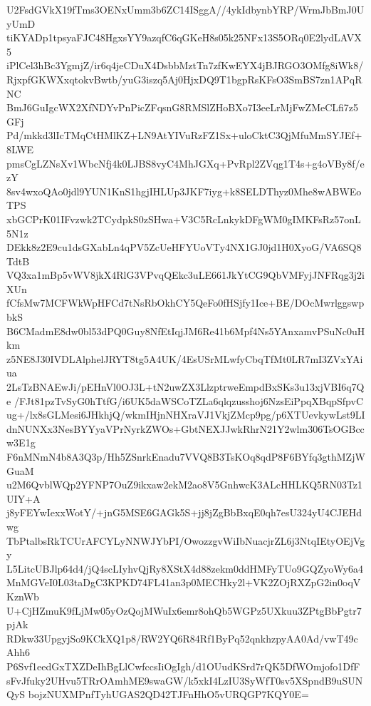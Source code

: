 U2FsdGVkX19fTms3OENxUmm3b6ZC14ISggA//4ykIdbynbYRP/WrmJbBmJ0UyUmD
tiKYADp1tpsyaFJC48HgxsYY9azqfC6qGKeH8s05k25NFx13S5ORq0E2lydLAVX5
iPlCel3hBc3YgmjZ/ir6q4jeCDuX4DsbbMztTn7zfKwEYX4jBJRGO3OMfg8iWk8/
RjxpfGKWXxqtokvBwtb/yuG3iszq5Aj0HjxDQ9T1bgpRsKFsO3SmBS7zn1APqRNC
BmJ6GuIgcWX2XfNDYvPnPicZFqsnG8RMSlZHoBXo7I3eeLrMjFwZMeCLfi7z5GFj
Pd/mkkd3lIcTMqCtHMlKZ+LN9AtYIVuRzFZ1Sx+uloCktC3QjMfuMmSYJEf+8LWE
pmsCgLZNsXv1WbcNfj4k0LJBS8vyC4MhJGXq+PvRpl2ZVqg1T4s+g4oVBy8f/ezY
8sv4wxoQAo0jdl9YUN1KnS1hgjIHLUp3JKF7iyg+k8SELDThyz0Mhe8wABWEoTPS
xbGCPrK01IFvzwk2TCydpkS0zSHwa+V3C5RcLnkykDFgWM0gIMKFsRz57onL5N1z
DEkk8z2E9cu1dsGXabLn4qPV5ZcUeHFYUoVTy4NX1GJ0jd1H0XyoG/VA6SQ8TdtB
VQ3xa1mBp5vWV8jkX4RlG3VPvqQEkc3uLE661JkYtCG9QbVMFyjJNFRqg3j2iXUn
fCfsMw7MCFWkWpHFCd7tNsRbOkhCY5QeFo0fHSjfy1Ice+BE/DOcMwrlggswpbkS
B6CMadmE8dw0bl53dPQ0Guy8NfEtIqjJM6Re41b6Mpf4Ns5YAnxamvPSuNc0uHkm
z5NE8J30IVDLAlphelJRYT8tg5A4UK/4EsUSrMLwfyCbqTfMt0LR7mI3ZVxYAiua
2LsTzBNAEwJi/pEHnVl0OJ3L+tN2uwZX3LlzptrweEmpdBxSKs3u13xjVBI6q7Qe
/FJt81pzTvSyG0hTtfG/i6UK5daWSCoTZLa6qlqzusshoj6NzsEiPpqXBqpSfpvC
ug+/lx8sGLMesi6JHkhjQ/wkmIHjnNHXraVJ1VkjZMcp9pg/p6XTUevkywLst9LI
dnNUNXx3NesBYYyaVPrNyrkZWOs+GbtNEXJJwkRhrN21Y2wlm306TsOGBccw3E1g
F6nMNmN4b8A3Q3p/Hh5ZSnrkEnadu7VVQ8B3TsKOq8qdP8F6BYfq3gthMZjWGuaM
u2M6QvblWQp2YFNP7OuZ9ikxaw2ekM2ao8V5GnhwcK3ALcHHLKQ5RN03Tz1UIY+A
j8yFEYwIexxWotY/+jnG5MSE6GAGk5S+jj8jZgBbBxqE0qh7esU324yU4CJEHdwg
TbPtalbsRkTCUrAFCYLyNNWJYbPI/OwozzgvWiIbNuacjrZL6j3NtqIEtyOEjVgy
L5LitcUBJlp64d4/jQ4scLIyhvQjRy8XStX4d88zekm0ddHMFyTUo9GQZyoWy6a4
MnMGVeI0L03taDgC3KPKD74FL41an3p0MECHky2l+VK2ZOjRXZpG2in0oqVKznWb
U+CjHZmuK9fLjMw05yOzQojMWuIx6emr8ohQb5WGPz5UXkuu3ZPtgBbPgtr7pjAk
RDkw33UpgyjSo9KCkXQ1p8/RW2YQ6R84Rf1ByPq52qnkhzpyAA0Ad/vwT49cAhh6
P6Svf1eedGxTXZDeIhBgLlCwfccsIiOgIgh/d1OUudKSrd7rQK5DfWOmjofo1DfF
sFvJfuky2UHvu5TRrOAmhME9swaGW/k5xkI4LzIU3SyWfT0sv5XSpndB9uSUNQyS
bojzNUXMPnfTyhUGAS2QD42TJFnHhO5vURQGP7KQY0E=
